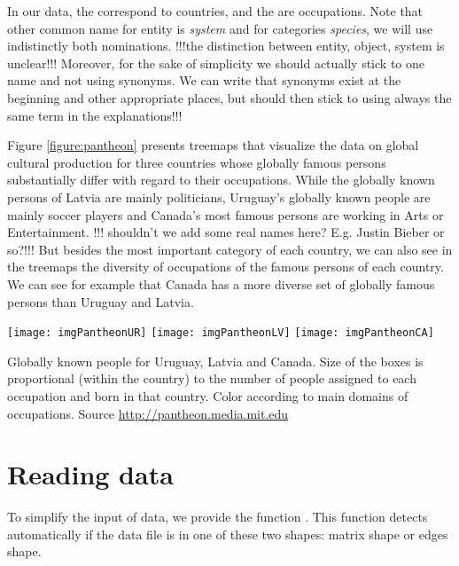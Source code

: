 In our data, the  correspond to countries, and the  are occupations. Note that other common name for entity is \emph{system} and for categories \emph{species}, we will use indistinctly both nominations.  
!!!the distinction between entity, object, system is unclear!!! Moreover, for the sake of simplicity we should actually stick to one name and not using synonyms. We can write that synonyms exist at the beginning and other appropriate places, but should then stick to using always the same term in the explanations!!!

Figure \ref{figure:pantheon} presents treemaps that visualize the data on global cultural production for three countries whose globally famous persons substantially differ with regard to their occupations. While the globally known persons of Latvia are mainly politicians, Uruguay's globally known people are mainly soccer players and Canada's most famous persons are working in Arts or Entertainment.  !!! shouldn't we add some real names here? E.g. Justin Bieber or so?!!! But besides the most important category of each country, we can also see in the treemaps the diversity of occupations of the famous persons of each country. We can see for example that Canada has a more diverse set of globally famous persons than Uruguay and Latvia.

\begin{widefigure}[htbp]
  \centering
 \texttt{[image: imgPantheonUR]} 
 \texttt{[image: imgPantheonLV]} 
   \texttt{[image: imgPantheonCA]} 
  \caption{Globally known people for Uruguay, Latvia and Canada. Size of the boxes is proportional (within the country) to the number of people assigned to each occupation and born in that country. Color according to main domains of occupations. Source \url{http://pantheon.media.mit.edu}}
  \label{figure:pantheon}
\end{widefigure}



\section{Reading data}

To simplify the input of data, we provide the function . This function detects automatically if the data file is in one of these two shapes: matrix shape or edges shape.


